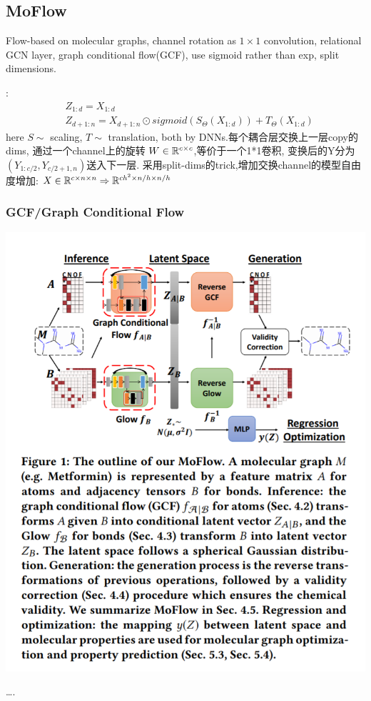 \documentclass{article}
\begin{document}
\subsection{MoFlow}

     Flow-based on molecular graphs, channel rotation as $1\times 1$ convolution, relational GCN layer, graph conditional flow(GCF), use sigmoid rather than exp, split dimensions.

    :
    \begin{align}
        &Z_{1:d} = X_{1:d}\\
        &Z_{d+1:n} = X_{d+1:n} \odot sigmoid(S_\Theta(X_{1:d}))+T_\Theta(X_{1:d})
    \end{align}
    here $S \sim $ scaling, $T \sim$ translation, both by DNNs.每个耦合层交换上一层copy的dims, 通过一个channel上的旋转 $W\in \mathbb{R}^{c\times c}$,等价于一个1*1卷积, 变换后的Y分为$(Y_{1:c/2}, Y_{c/2+1,n})$送入下一层. 采用split-dims的trick,增加交换channel的模型自由度增加: $X\in \mathbb{R}^{c\times n \times n}\Rightarrow \mathbb{R}^{ch^2\times n/h \times n/h}$

\subsubsection{GCF/Graph Conditional Flow}

    \centerline{\includegraphics[width=0.85\paperwidth]{moflow-arch.PNG}}
     \dots. 
\end{document}
